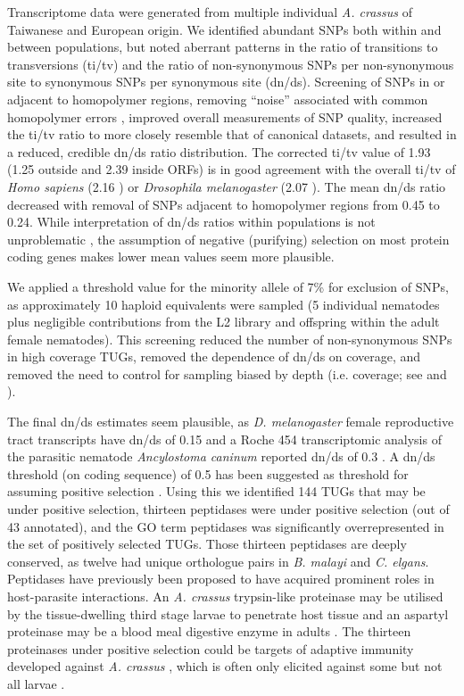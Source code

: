 \documentclass[10pt]{bmc_article}
\newenvironment{bmcformat}{\begin{raggedright}\baselineskip20pt\sloppy\setboolean{publ}{false}}{\end{raggedright}\baselineskip20pt\sloppy}
\begin{document}
\begin{bmcformat}
Transcriptome data were generated from multiple individual
\textit{A. crassus} of Taiwanese and European origin. We identified
abundant SNPs both within and between populations, but noted aberrant
patterns in the ratio of transitions to transversions (ti/tv) and the
ratio of non-synonymous SNPs per non-synonymous site to synonymous
SNPs per synonymous site (dn/ds). Screening of SNPs in or adjacent to
homopolymer regions, removing “noise'' associated with common
homopolymer errors \cite{pmid21685085}, improved overall measurements
of SNP quality, increased the ti/tv ratio to more closely resemble
that of canonical datasets, and resulted in a reduced, credible dn/ds
ratio distribution. The corrected ti/tv value of 1.93 (1.25 outside
and 2.39 inside ORFs) is in good agreement with the overall ti/tv of
\textit{Homo sapiens} (2.16 \cite{pmid21169219}) or \textit{Drosophila
  melanogaster} (2.07 \cite{pmid21143862}). The mean dn/ds ratio
decreased with removal of SNPs adjacent to homopolymer regions from
0.45 to 0.24. While interpretation of dn/ds ratios within populations
is not unproblematic \cite{pmid19081788}, the assumption of negative
(purifying) selection on most protein coding genes makes lower mean
values seem more plausible.


We applied a threshold value for the minority allele of 7\% for
exclusion of SNPs, as approximately 10 haploid equivalents were
sampled (5 individual nematodes plus negligible contributions from the
L2 library and offspring within the adult female nematodes). This
screening reduced the number of non-synonymous SNPs in high coverage
TUGs, removed the dependence of dn/ds on coverage, and removed the
need to control for sampling biased by depth (i.e. coverage; see
\cite{pmid18590545} and \cite{pmid20478048}).

The final dn/ds estimates seem plausible, as \textit{D. melanogaster}
female reproductive tract transcripts have dn/ds of 0.15
\cite{pmid15579698} and a Roche 454 transcriptomic analysis of the
parasitic nematode \textit{Ancylostoma caninum} reported dn/ds of 0.3
\cite{pmid20470405}. A dn/ds threshold (on coding sequence) of 0.5 has
been suggested as threshold for assuming positive selection
\cite{pmid15579698}. Using this we identified 144 TUGs that may be
under positive selection, thirteen peptidases were under positive
selection (out of 43 annotated), and the GO term peptidases was
significantly overrepresented in the set of positively selected
TUGs. Those thirteen peptidases are deeply conserved, as twelve had
unique orthologue pairs in \textit{B. malayi} and
\textit{C. elgans}. Peptidases have previously been proposed to have
acquired prominent roles in host-parasite interactions. An
\textit{A. crassus} trypsin-like proteinase may be utilised by the
tissue-dwelling third stage larvae to penetrate host tissue and an
aspartyl proteinase may be a blood meal digestive enzyme in adults
\cite{polzer_identification_1993}. The thirteen proteinases under
positive selection could be targets of adaptive immunity developed
against \textit{A. crassus} \cite{knopf_migratory_2008,
  knopf_vaccination_2008}, which is often only elicited against some
but not all larvae \cite{molnar_caps}.


\end{bmcformat}
\end{document}
